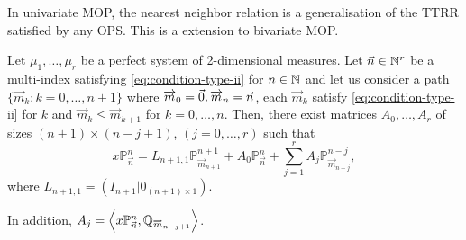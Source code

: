\documentclass[portrait,final,a0paper,fontscale=0.38]{baposter}
\begin{document}
\begin{poster}
{%
}

{
  In univariate MOP, the nearest neighbor relation is a generalisation of the TTRR satisfied by any OPS. This is a extension to bivariate MOP.
\begin{theorem} 
  Let $\mu_1,\dots,\mu_r$ be a perfect system of 2-dimensional measures. Let $\vec n\in \mathbb{N}^r$ be a multi-index satisfying \eqref{eq:condition-type-ii} for $n\in\mathbb{N}$ and let us consider a path $\{\overrightarrow{m}_k:k=0,\dots,n+1\}$ where $\overrightarrow{m}_0=\vec 0, \linebreak\overrightarrow{m}_n = \vec n$, each $\overrightarrow{m}_k$ satisfy \eqref{eq:condition-type-ii} for $k$ and $\overrightarrow{m}_k \leq \overrightarrow m_{k+1}$ for \linebreak$k=0,\dots,n$. Then, there exist matrices $A_0,\dots,A_r$ of sizes $(n+1)\times(n-j+1)$,  $(j=0,\dots,r)$ such that
  \begin{equation}
      \label{eq:nearest-neighbor}
      \boxed{x\mathbb P_{\vec n}^n = L_{{n+1},1} \mathbb P_{\overrightarrow{m}_{n+1}}^{n+1} + A_0 \mathbb P_{\vec n}^n + \sum_{j=1}^r A_j \mathbb P_{\overrightarrow{m}_{n-j}}^{n-j},}
  \end{equation}
  where $L_{n+1,1}=(I_{n+1}|0_{(n+1)\times 1})$. 
  
  In addition, $A_j =\nolinebreak \prodesc{x\mathbb P_{\vec n}^n}{\mathbb Q_{\overrightarrow{m}_{n-j+1}}}$.
\end{theorem}


}


\end{poster}
\end{document}
